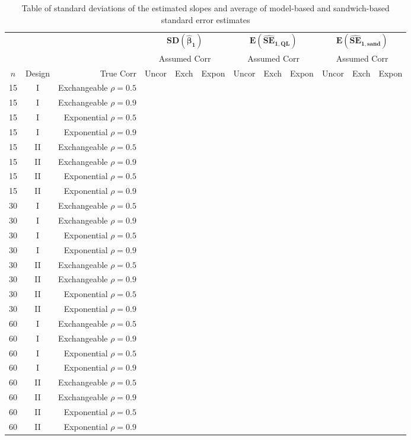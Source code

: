 \documentclass[11pt, letterpaper]{article}
\begin{document}
\begin{table}
  \scriptsize
\centering
\begin{tabular}{ccr|ccc|ccc|ccc}
&&&\multicolumn{3}{|c}{$\mathbf{SD(\hat\beta_1)}$}&\multicolumn{3}{|c}{$\mathbf{E(\widehat{SE}_{1,QL})}$}&\multicolumn{3}{|c}{$\mathbf{E(\widehat{SE}_{1,sand})}$}\\
&&&\multicolumn{3}{c}{Assumed Corr}&\multicolumn{3}{|c}{Assumed Corr}&\multicolumn{3}{|c}{Assumed Corr}\\
$n$ & Design & True Corr & Uncor & Exch & Expon & Uncor & Exch & Expon & Uncor & Exch & Expon \\ \hline
15 &  I & Exchangeable $\rho=0.5$ & & & & & & & & & \\
15 &  I & Exchangeable $\rho=0.9$ & & & & & & & & & \\
15 &  I &         Exponential $\rho=0.5$ & & & & & & & & & \\
15 &  I &         Exponential $\rho=0.9$ & & & & & & & & & \\ [1ex]
15 & II & Exchangeable $\rho=0.5$ & & & & & & & & & \\
15 & II & Exchangeable $\rho=0.9$ & & & & & & & & & \\
15 & II &         Exponential $\rho=0.5$ & & & & & & & & & \\
15 & II &         Exponential $\rho=0.9$ & & & & & & & & & \\ [2ex]
30 &  I & Exchangeable $\rho=0.5$ & & & & & & & & & \\
30 &  I & Exchangeable $\rho=0.9$ & & & & & & & & & \\
30 &  I &         Exponential $\rho=0.5$ & & & & & & & & & \\
30 &  I &         Exponential $\rho=0.9$ & & & & & & & & & \\ [1ex]
30 & II & Exchangeable $\rho=0.5$ & & & & & & & & & \\
30 & II & Exchangeable $\rho=0.9$ & & & & & & & & & \\
30 & II &         Exponential $\rho=0.5$ & & & & & & & & & \\
30 & II &         Exponential $\rho=0.9$ & & & & & & & & & \\ [2ex]
60 &  I & Exchangeable $\rho=0.5$ & & & & & & & & & \\
60 &  I & Exchangeable $\rho=0.9$ & & & & & & & & & \\
60 &  I &         Exponential $\rho=0.5$ & & & & & & & & & \\
60 &  I &        Exponential $\rho=0.9$ & & & & & & & & & \\ [1ex]
60 & II & Exchangeable $\rho=0.5$ & & & & & & & & & \\
60 & II & Exchangeable $\rho=0.9$ & & & & & & & & & \\
60 & II &         Exponential $\rho=0.5$ & & & & & & & & & \\
60 & II &         Exponential $\rho=0.9$ & & & & & & & & & 
\end{tabular}
\caption{Table of standard deviations of the estimated slopes and 
  average of model-based and sandwich-based standard error estimates}
\label{tab:p1_results}
\end{table}
\end{document}
